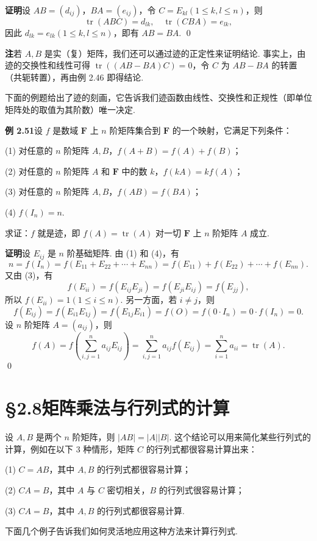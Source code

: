 \documentclass[UTF8, 12pt, fontset=fandol, oneside]{ctexart}
\begin{document}
\noindent\textbf{证明}\quad 设 $AB=(d_{ij})$，$BA=(e_{ij})$，令 $C=E_{kl}(1\le k,l\le n)$，则
\[
\operatorname{tr}(ABC)=d_{lk},\quad \operatorname{tr}(CBA)=e_{lk},
\]
因此 $d_{lk}=e_{lk}(1\le k,l\le n)$，即有 $AB=BA$. \qed

\noindent\textbf{注}\quad 若 $A,B$ 是实（复）矩阵，我们还可以通过迹的正定性来证明结论. 事实上，由迹的交换性和线性可得 $\operatorname{tr}((AB-BA)C)=0$，令 $C$ 为 $AB-BA$ 的转置（共轭转置），再由例 2.46 即得结论.

下面的例题给出了迹的刻画，它告诉我们迹函数由线性、交换性和正规性（即单位矩阵处的取值为其阶数）唯一决定.

\noindent\textbf{例 2.51}\quad 设 $f$ 是数域 $\mathbf F$ 上 $n$ 阶矩阵集合到 $\mathbf F$ 的一个映射，它满足下列条件：

(1) 对任意的 $n$ 阶矩阵 $A,B$，$f(A+B)=f(A)+f(B)$；

(2) 对任意的 $n$ 阶矩阵 $A$ 和 $\mathbf F$ 中的数 $k$，$f(kA)=kf(A)$；

(3) 对任意的 $n$ 阶矩阵 $A,B$，$f(AB)=f(BA)$；

(4) $f(I_n)=n$.

求证：$f$ 就是迹，即 $f(A)=\operatorname{tr}(A)$ 对一切 $\mathbf F$ 上 $n$ 阶矩阵 $A$ 成立.

\noindent\textbf{证明}\quad 设 $E_{ij}$ 是 $n$ 阶基础矩阵. 由 (1) 和 (4)，有
\[
n=f(I_n)=f(E_{11}+E_{22}+\cdots+E_{nn})=f(E_{11})+f(E_{22})+\cdots+f(E_{nn}).
\]
又由 (3)，有
\[
f(E_{ii})=f(E_{ij}E_{ji})=f(E_{ji}E_{ij})=f(E_{jj}),
\]
所以 $f(E_{ii})=1(1\le i\le n)$. 另一方面，若 $i\ne j$，则
\[
f(E_{ij})=f(E_{i1}E_{1j})=f(E_{1j}E_{i1})=f(O)=f(0\cdot I_n)=0\cdot f(I_n)=0.
\]
设 $n$ 阶矩阵 $A=(a_{ij})$，则
\[
f(A)=f\left(\sum_{i,j=1}^n a_{ij}E_{ij}\right)
=\sum_{i,j=1}^n a_{ij}f(E_{ij})
=\sum_{i=1}^n a_{ii}
=\operatorname{tr}(A).
\]
\qed

\section*{§2.8\quad 矩阵乘法与行列式的计算}

设 $A,B$ 是两个 $n$ 阶矩阵，则 $|AB|=|A||B|$. 这个结论可以用来简化某些行列式的计算，例如在以下 3 种情形，矩阵 $C$ 的行列式都很容易计算出来：

(1) $C=AB$，其中 $A,B$ 的行列式都很容易计算；

(2) $CA=B$，其中 $A$ 与 $C$ 密切相关，$B$ 的行列式很容易计算；

(3) $CA=B$，其中 $A,B$ 的行列式都很容易计算.

下面几个例子告诉我们如何灵活地应用这种方法来计算行列式.
\end{document}
